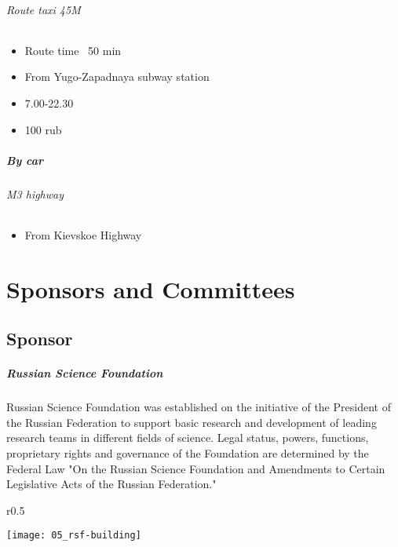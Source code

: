 \documentclass[10pt,fleqn,openany]{book} %
\begin{document}
\subparagraph{Route taxi 45M}
\begin{itemize}
	\item Route time ~50 min
	\item From Yugo-Zapadnaya subway station
	\item 7.00-22.30
	\item 100 rub
\end{itemize}

\paragraph{By car}
\subparagraph{M3 highway}
\begin{itemize}
	\item From Kievskoe Highway
\end{itemize}




\chapter{Sponsors and Committees}

\section{Sponsor}
\paragraph{Russian Science Foundation}
Russian Science Foundation was established on the initiative of the President of the Russian Federation to support basic research and development of leading research teams in different fields of science. Legal status, powers, functions, proprietary rights and governance of the Foundation are determined by the Federal Law "On the Russian Science Foundation and Amendments to Certain Legislative Acts of the Russian Federation."

\begin{wrapfigure}{r}{0.5\textwidth}
	\begin{center}
		\texttt{[image: 05\_rsf-building]}
	\end{center}
\end{wrapfigure}
\end{document}
